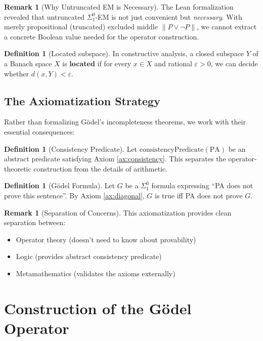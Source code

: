 \documentclass[11pt]{article}
\theoremstyle{definition}
\newtheorem{definition}[theorem]{Definition}
\newtheorem{remark}[theorem]{Remark}
\newcommand{\SigOne}{\Sigma^{0}_{\!1}}
\newcommand{\PA}{\mathrm{PA}}
\begin{document}
\begin{remark}[Why Untruncated EM is Necessary]
The Lean formalization revealed that untruncated $\SigOne$-EM is not just convenient but \emph{necessary}. With merely propositional (truncated) excluded middle $\|P \lor \neg P\|$, we cannot extract a concrete Boolean value needed for the operator construction.
\end{remark}

\begin{definition}[Located subspace]
In constructive analysis, a closed subspace $Y$ of a Banach space $X$ is \textbf{located} if for every $x \in X$ and rational $\varepsilon > 0$, we can decide whether $d(x,Y) < \varepsilon$.
\end{definition}

\subsection{The Axiomatization Strategy}

Rather than formalizing Gödel's incompleteness theorems, we work with their essential consequences:

\begin{definition}[Consistency Predicate]
Let $\text{consistencyPredicate}(\PA)$ be an abstract predicate satisfying Axiom \ref{ax:consistency}. This separates the operator-theoretic construction from the details of arithmetic.
\end{definition}

\begin{definition}[Gödel Formula]
Let $G$ be a $\SigOne$ formula expressing ``PA does not prove this sentence''. By Axiom \ref{ax:diagonal}, $G$ is true iff PA does not prove $G$.
\end{definition}

\begin{remark}[Separation of Concerns]
This axiomatization provides clean separation between:
\begin{itemize}
\item Operator theory (doesn't need to know about provability)
\item Logic (provides abstract consistency predicate)
\item Metamathematics (validates the axioms externally)
\end{itemize}
\end{remark}

\section{Construction of the Gödel Operator}
\end{document}
